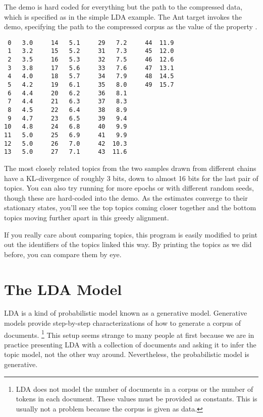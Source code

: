 The demo is hard coded for everything but the path to the compressed
data, which is specified as in the simple LDA example.  The Ant target
 invokes the demo, specifying the path to the
compressed corpus as the value of the property .
%
\begin{verbatim}
 0   3.0     14   5.1     29   7.2     44  11.9
 1   3.2     15   5.2     31   7.3     45  12.0
 2   3.5     16   5.3     32   7.5     46  12.6
 3   3.8     17   5.6     33   7.6     47  13.1
 4   4.0     18   5.7     34   7.9     48  14.5
 5   4.2     19   6.1     35   8.0     49  15.7
 6   4.4     20   6.2     36   8.1
 7   4.4     21   6.3     37   8.3
 8   4.5     22   6.4     38   8.9
 9   4.7     23   6.5     39   9.4
10   4.8     24   6.8     40   9.9
11   5.0     25   6.9     41   9.9
12   5.0     26   7.0     42  10.3
13   5.0     27   7.1     43  11.6
\end{verbatim}    
%
The most closely related topics from the two samples drawn from
different chains have a KL-divergence of roughly 3 bits, down to
almost 16 bits for the last pair of topics.  You can also try running
for more epochs or with different random seeds, though these are
hard-coded into the demo.  As the estimates converge to their stationary
states, you'll see the top topics coming closer together and the
bottom topics moving further apart in this greedy alignment.

If you really care about comparing topics, this program is easily
modified to print out the identifiers of the topics linked
this way.  By printing the topics as we did before, you can
compare them by eye.
    


\section{The LDA Model}\label{section:lda-model}

LDA is a kind of probabilistic model known as a generative model.
Generative models provide step-by-step characterizations of how to
generate a corpus of documents.%
%
\footnote{LDA does not model the number of documents in a corpus
or the number of tokens in each document.  These values must be
provided as constants.  This is usually not a problem because
the corpus is given as data.}
%
This setup seems strange to many people at first because we are in
practice presenting LDA with a collection of documents and asking it
to infer the topic model, not the other way around.  Nevertheless, the
probabilistic model is generative.

